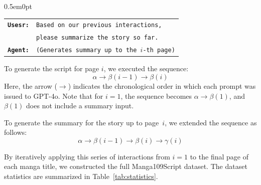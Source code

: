 \documentclass[sigconf, screen, review, anonymous]{acmart}
\begin{document}
\begin{itemize}
    \begin{adjustwidth}{0.5em}{0pt}
    \setlength{\tabcolsep}{2pt}
    \begin{tabular}{@{}r l@{}}
    \texttt{\textbf{Usesr:}} & \texttt{Based on our previous interactions,} \\
                          & \texttt{please summarize the story so far.} \\
    \texttt{\textbf{Agent:}} & \texttt{(Generates summary up to the $i$-th page)} \\
    \end{tabular}
    \end{adjustwidth}
\end{itemize}

To generate the script for page $i$, we executed the sequence:
\[
\alpha \rightarrow \beta(i{-}1) \rightarrow \beta(i)
\]
Here, the arrow ($\rightarrow$) indicates the chronological order in which each prompt was issued to GPT-4o. Note that for $i = 1$, the sequence becomes $\alpha \rightarrow \beta(1)$, and $\beta(1)$ does not include a summary input.

To generate the summary for the story up to page~$i$, we extended the sequence as follows:
\[
\alpha \rightarrow \beta(i{-}1) \rightarrow \beta(i) \rightarrow \gamma(i)
\]

By iteratively applying this series of interactions from $i = 1$ to the final page of each manga title, we constructed the full Manga109Script dataset. The dataset statistics are summarized in Table~\ref{tab:statistics}.
\end{document}
